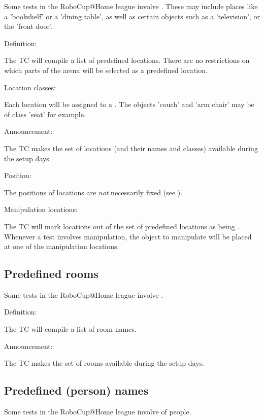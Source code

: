 Some tests in the RoboCup@Home league involve . 
These may include places like a 'bookshelf' or a 'dining table', as well as certain objects such as a 'television', or the 'front door'. 

\begin{enumerate}
{\bf\item Definition:} The TC will compile a list of predefined locations.
  There are no restrictions on which parts of the arena will be selected as a predefined location. 
{\bf\item Location classes:} Each location will be assigned to a . 
  The objects 'couch' and 'arm chair' may be of class 'seat' for example. 
{\bf\item Announcement:} The TC makes the set of locations (and their names and classes) available during the setup days.
{\bf\item Position:} The positions of locations are \emph{not} necessarily fixed (see ).
{\bf\item Manipulation locations:} The TC will mark \NumLocations locations out of the set of predefined locations as being .
Whenever a test involves manipulation, the object to manipulate will be placed 
at one of the manipulation locations. 
\end{enumerate}



\subsection{Predefined rooms}\label{rule:scenario_rooms}
Some tests in the RoboCup@Home league involve . 
\begin{enumerate}
{\bf\item Definition:} The TC will compile a list of room names.
{\bf\item Announcement:} The TC makes the set of rooms available during the setup days.
\end{enumerate}



\subsection{Predefined (person) names}\label{rule:scenario_names}

Some tests in the RoboCup@Home league involve  of people. 

